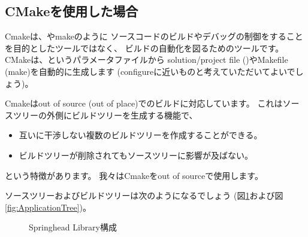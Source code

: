 \subsection{CMakeを使用した場合}
\label{subsec:WhenUsedCMake}

\noindent
Cmakeは、\VS やmakeのように
ソースコードのビルドやデバッグの制御をすることを目的としたツールではなく、
ビルドの自動化を図るためのツールです。
CMakeは、\CMakeLists{}というパラメータファイルから
solution/project file (\VS)やMakefile (make)を自動的に生成します
(configureに近いものと考えていただいてよいでしょう)。

\medskip
\noindent
Cmakeはout of source (out of place)でのビルドに対応しています。
これはソースツリーの外側にビルドツリーを生成する機能で、
\begin{itemize}
  \item	互いに干渉しない複数のビルドツリーを作成することができる。
  \item	ビルドツリーが削除されてもソースツリーに影響が及ばない。
\end{itemize}
という特徴があります。
我々はCmakeをout of sourceで使用します。

\medskip
\noindent
ソースツリーおよびビルドツリーは次のようになるでしょう
(図\ref{fig:SpringheadLibraryTree}および図\ref{fig:ApplicationTree})。

\begin{narrow}\begin{figure}[h]
    \begin{narrow}[40pt]\begin{minipage}{\textwidth}
	{\footnotesize{}}
	\medskip
    \end{minipage}\end{narrow}
    \caption{Springhead Library構成}
    \label{fig:SpringheadLibraryTree}
\end{figure}\end{narrow}

